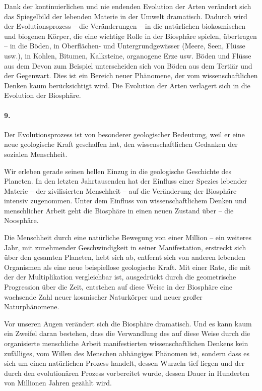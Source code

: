 \documentclass[11pt,a4paper]{book}
\begin{document}
Dank der kontinuierlichen und nie endenden Evolution der Arten verändert sich
das Spiegelbild der lebenden Materie in der Umwelt dramatisch. Dadurch wird
der Evolutionsprozess -- die Veränderungen -- in die natürlichen biokosmischen
und biogenen Körper, die eine wichtige Rolle in der Biosphäre spielen,
übertragen -- in die Böden, in Oberflächen- und Untergrundgewässer (Meere,
Seen, Flüsse usw.), in Kohlen, Bitumen, Kalksteine, organogene Erze usw. Böden
und Flüsse aus dem Devon zum Beispiel unterscheiden sich von Böden aus dem
Tertiär und der Gegenwart. Dies ist ein Bereich neuer Phänomene, der vom
wissenschaftlichen Denken kaum berücksichtigt wird. Die Evolution der Arten
verlagert sich in die Evolution der Biosphäre.

\paragraph{9.}
Der Evolutionsprozess ist von besonderer geologischer Bedeutung, weil er eine
neue geologische Kraft geschaffen hat, den wissenschaftlichen Gedanken der
sozialen Menschheit.

Wir erleben gerade seinen hellen Einzug in die geologische Geschichte des
Planeten. In den letzten Jahrtausenden hat der Einfluss einer Spezies lebender
Materie -- der zivilisierten Menschheit -- auf die Veränderung der Biosphäre
intensiv zugenommen. Unter dem Einfluss von wissenschaftlichem Denken und
menschlicher Arbeit geht die Biosphäre in einen neuen Zustand über -- die
Noosphäre.

Die Menschheit durch eine natürliche Bewegung von einer Million -- ein
weiteres Jahr, mit zunehmender Geschwindigkeit in seiner Manifestation,
erstreckt sich über den gesamten Planeten, hebt sich ab, entfernt sich von
anderen lebenden Organismen als eine neue beispiellose geologische Kraft. Mit
einer Rate, die mit der der Multiplikation vergleichbar ist, ausgedrückt durch
die geometrische Progression über die Zeit, entstehen auf diese Weise in der
Biosphäre eine wachsende Zahl neuer kosmischer Naturkörper und neuer großer
Naturphänomene.

Vor unseren Augen verändert sich die Biosphäre dramatisch. Und es kann kaum
ein Zweifel daran bestehen, dass die Verwandlung des auf diese Weise durch die
organisierte menschliche Arbeit manifestierten wissenschaftlichen Denkens kein
zufälliges, vom Willen des Menschen abhängiges Phänomen ist, sondern dass es
sich um einen natürlichen Prozess handelt, dessen Wurzeln tief liegen und der
durch den evolutionären Prozess vorbereitet wurde, dessen Dauer in Hunderten
von Millionen Jahren gezählt wird.
\end{document}
